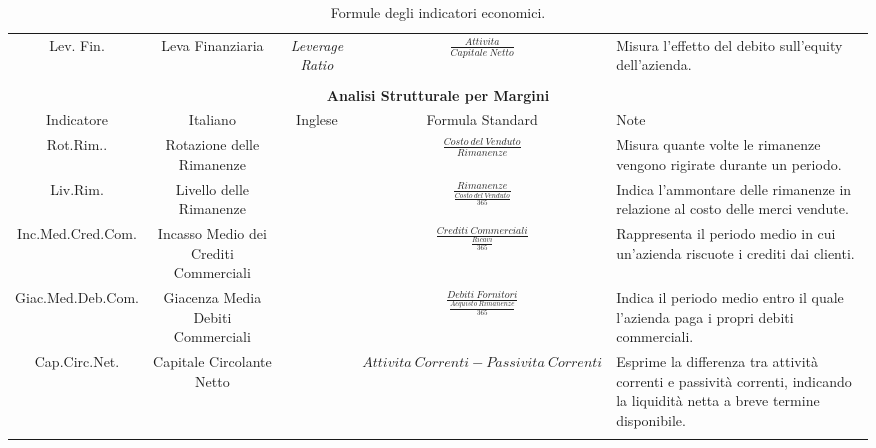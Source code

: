 \documentclass{article}
\newcommand{\lfDesc}{Misura l'effetto del debito sull'equity dell'azienda.}
\newcommand{\rrDesc}{Misura quante volte le rimanenze vengono rigirate durante un periodo.}
\newcommand{\lrDesc}{Indica l'ammontare delle rimanenze in relazione al costo delle merci vendute.}
\newcommand{\imccDesc}{Rappresenta il periodo medio in cui un'azienda riscuote i crediti dai clienti.}
\newcommand{\gmdcDesc}{Indica il periodo medio entro il quale l'azienda paga i propri debiti commerciali.}
\newcommand{\ccnDesc}{Esprime la differenza tra attività correnti e passività correnti, indicando la liquidità netta a breve termine disponibile.}
\begin{document}
\begin{table}[ht]
{\begin{tabular}{|c|c|c|c|l|}
            Lev. Fin.         & Leva Finanziaria                      & \textit{Leverage Ratio}                                           & $\displaystyle\frac{Attivita}{Capitale\ Netto}$                                       & \lfDesc               \\
                              &                                       &                                                                   &                                                                                       &                       \\
            \hline
            \hline
            \multicolumn{5}{|c|}{\textbf{Analisi Strutturale per Margini}}                                                                                                                                                                                \\
            \hline
            Indicatore        & Italiano                              & Inglese                                                           & Formula Standard                                                                      & Note                  \\
            \hline
            Rot.Rim..         & Rotazione delle Rimanenze             &                                                                   & $\displaystyle\frac{Costo\ del\ Venduto}{Rimanenze}$                                  & \rrDesc               \\
            Liv.Rim.          & Livello delle Rimanenze               &                                                                   & $\displaystyle\frac{Rimanenze}{\displaystyle\frac{Costo\ del\ Venduto}{365}}$         & \lrDesc               \\
            Inc.Med.Cred.Com. & Incasso Medio dei Crediti Commerciali &                                                                   & $\displaystyle\frac{Crediti\ Commerciali}{\displaystyle\frac{Ricavi}{365}}$           & \imccDesc             \\
            Giac.Med.Deb.Com. & Giacenza Media Debiti Commerciali     &                                                                   & $\displaystyle\frac{Debiti\ Fornitori}{\displaystyle\frac{Acquisto\ Rimanenze}{365}}$ & \gmdcDesc             \\
            Cap.Circ.Net.     & Capitale Circolante Netto             &                                                                   & $Attivita\ Correnti - Passivita\ Correnti$                                            & \ccnDesc              \\
                              &                                       &                                                                   &                                                                                       &                       \\
            \hline
        \end{tabular}
    }
    \caption{Formule degli indicatori economici.}
\end{table}
\end{document}
